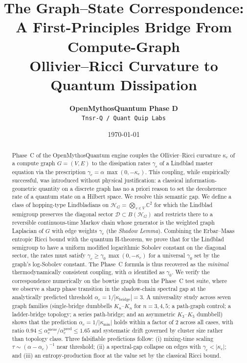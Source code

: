 \documentclass[11pt,letterpaper]{article}
\title{The Graph--State Correspondence: \\
A First-Principles Bridge From Compute-Graph \\
Ollivier--Ricci Curvature to Quantum Dissipation}
\author{\textbf{OpenMythosQuantum Phase D} \\
\small \texttt{Tnsr-Q / Quant Quip Labs}}
\date{\today}
\theoremstyle{definition}
\theoremstyle{remark}
\newcommand{\cc}{\mathbb{C}}
\newcommand{\Hil}{\mathcal{H}}
\newcommand{\Diag}{\mathcal{D}}
\begin{document}
\maketitle

\begin{abstract}
\noindent
Phase~C of the OpenMythosQuantum engine couples the Ollivier--Ricci curvature
$\kappa_e$ of a compute graph $G=(V,E)$ to the dissipation rates $\gamma_e$ of a
Lindblad master equation via the prescription
$\gamma_e = \alpha\,\max(0,-\kappa_e)$.
This coupling, while empirically successful, was introduced without physical
justification: a classical information-geometric quantity on a discrete graph
has no a priori reason to set the decoherence rate of a quantum state on a
Hilbert space.
We resolve this semantic gap.
We define a class of hopping-type Lindbladians on $\Hil_G = \bigotimes_{v\in V}\cc^2$
for which the Lindblad semigroup preserves the diagonal sector
$\Diag \subset B(\Hil_G)$ and restricts there to a reversible
continuous-time Markov chain whose generator is the weighted graph Laplacian of
$G$ with edge weights $\gamma_e$ (the \emph{Shadow Lemma}).
Combining the Erbar--Maas entropic Ricci bound with the quantum
H-theorem, we prove that for the Lindblad semigroup to have a uniform
modified logarithmic Sobolev constant on the diagonal sector, the rates must
satisfy $\gamma_e \ge \gamma_0\,\max(0,-\kappa_e)$ for a universal
$\gamma_0$ set by the graph's log-Sobolev constant.
The Phase~C formula is thus recovered as the \emph{minimal} thermodynamically
consistent coupling, with $\alpha$ identified as $\gamma_0$.
We verify the correspondence numerically on the bowtie graph from the Phase~C
test suite, where we observe a sharp phase transition in the shadow-chain
spectral gap at the analytically predicted threshold
$\alpha_c = 1/|\kappa_{\mathrm{bridge}}| = 3$.
A universality study across seven graph families (single-bridge dumbbells
$K_n$--$K_n$ for $n=3,4,5$; a path-graph control; a ladder-bridge topology;
a series path-bridge; and an asymmetric $K_3$--$K_5$ dumbbell) shows that
the prediction $\alpha_c = 1/|\kappa_{\min}|$ holds within a factor of 2
across all cases, with ratio $0.94 \le \alpha_c^{\mathrm{meas}} /
\alpha_c^{\mathrm{pred}} \le 1.65$ and systematic drift governed by cluster
size rather than topology class.
Three falsifiable predictions follow: (i) mixing-time scaling
$\tau \sim (\alpha - \alpha_c)^{-1}$ near threshold; (ii) a
spectral-gap collapse on edges with $\gamma_e < |\kappa_e|$; and (iii) an
entropy-production floor at the value set by the classical Ricci bound.
\end{abstract}
\end{document}
